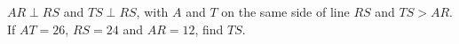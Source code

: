 $AR\perp RS$ and $TS\perp RS$, with $A$ and $T$ on the same side of line $RS$ and $TS>AR$. If $AT=26$, $RS=24$ and $AR=12$, find $TS$.

